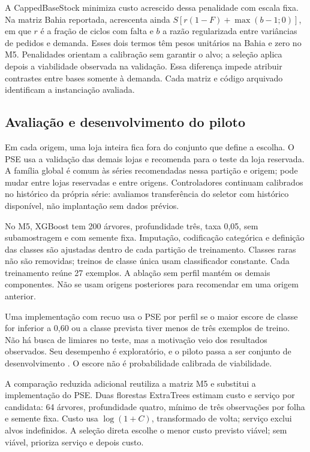 \documentclass[preprint,12pt]{elsarticle}
\begin{document}
A CappedBaseStock minimiza custo acrescido dessa penalidade com escala fixa. Na matriz Bahia reportada, acrescenta ainda $S[r(1-F)+\max(b-1;0)]$, em que $r$ é a fração de ciclos com falta e $b$ a razão regularizada entre variâncias de pedidos e demanda. Esses dois termos têm pesos unitários na Bahia e zero no M5. Penalidades orientam a calibração sem garantir o alvo; a seleção aplica depois a viabilidade observada na validação. Essa diferença impede atribuir contrastes entre bases somente à demanda. Cada matriz e código arquivado identificam a instanciação avaliada.

\subsection{Avaliação e desenvolvimento do piloto}
Em cada origem, uma loja inteira fica fora do conjunto que define a escolha. O PSE usa a validação das demais lojas e recomenda para o teste da loja reservada. A família global é comum às séries recomendadas nessa partição e origem; pode mudar entre lojas reservadas e entre origens. Controladores continuam calibrados no histórico da própria série: avaliamos transferência do seletor com histórico disponível, não implantação sem dados prévios.

No M5, XGBoost tem 200 árvores, profundidade três, taxa 0,05, sem subamostragem e com semente fixa. Imputação, codificação categórica e definição das classes são ajustadas dentro de cada partição de treinamento. Classes raras não são removidas; treinos de classe única usam classificador constante. Cada treinamento reúne 27 exemplos. A ablação sem perfil mantém os demais componentes. Não se usam origens posteriores para recomendar em uma origem anterior.

Uma implementação com recuo usa o PSE por perfil se o maior escore de classe for inferior a 0,60 ou a classe prevista tiver menos de três exemplos de treino. Não há busca de limiares no teste, mas a motivação veio dos resultados observados. Seu desempenho é exploratório, e o piloto passa a ser conjunto de desenvolvimento \cite{CawleyTalbot2010}. O escore não é probabilidade calibrada de viabilidade.

A comparação reduzida adicional reutiliza a matriz M5 e substitui a implementação do PSE. Duas florestas ExtraTrees estimam custo e serviço por candidata: 64 árvores, profundidade quatro, mínimo de três observações por folha e semente fixa. Custo usa $\log(1+C)$, transformado de volta; serviço exclui alvos indefinidos. A seleção direta escolhe o menor custo previsto viável; sem viável, prioriza serviço e depois custo.
\end{document}
